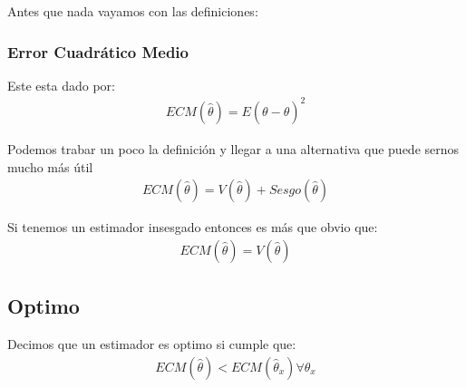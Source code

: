 \documentclass[12pt, fleqn]{report}                             %
\theoremstyle{break}                                            %
\begin{document}
                Antes que nada vayamos con las definiciones:

                \vspace{1em}
                \subsubsection{Error Cuadrático Medio}

                    Este esta dado por:
                    \begin{align*}
                        ECM(\hat \theta) = E(\theta - \hat \theta)^2
                    \end{align*}


                    Podemos trabar un poco la definición y llegar a una alternativa
                    que puede sernos mucho más útil
                    \begin{align*}
                        ECM(\hat \theta) = V(\hat \theta) + Sesgo(\hat \theta)
                    \end{align*}

                    Si tenemos un estimador insesgado entonces es más que obvio
                    que:
                    \begin{align*}
                        ECM(\hat \theta) = V(\hat \theta)
                    \end{align*}


            \vspace{2em}
            \subsection{Optimo}

                Decimos que un estimador es optimo si cumple que:
                \begin{align*}
                    ECM(\hat \theta) < ECM(\hat \theta_x) \forall \theta_x 
                \end{align*}


            \vspace{2em}
\end{document}

